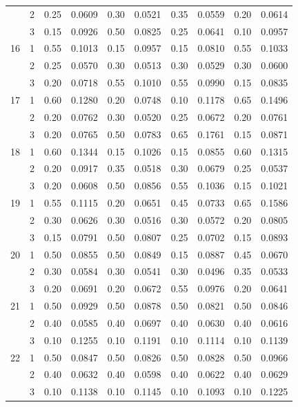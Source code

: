 \begin{longtable}{llcccccccc}
   & 2 & 0.25 & 0.0609 & 0.30 & 0.0521 & 0.35 & 0.0559 & 0.20 & 0.0614 \\ 
   & 3 & 0.15 & 0.0926 & 0.50 & 0.0825 & 0.25 & 0.0641 & 0.10 & 0.0957 \\ 
  16 & 1 & 0.55 & 0.1013 & 0.15 & 0.0957 & 0.15 & 0.0810 & 0.55 & 0.1033 \\ 
   & 2 & 0.25 & 0.0570 & 0.30 & 0.0513 & 0.30 & 0.0529 & 0.30 & 0.0600 \\ 
   & 3 & 0.20 & 0.0718 & 0.55 & 0.1010 & 0.55 & 0.0990 & 0.15 & 0.0835 \\ 
  17 & 1 & 0.60 & 0.1280 & 0.20 & 0.0748 & 0.10 & 0.1178 & 0.65 & 0.1496 \\ 
   & 2 & 0.20 & 0.0762 & 0.30 & 0.0520 & 0.25 & 0.0672 & 0.20 & 0.0761 \\ 
   & 3 & 0.20 & 0.0765 & 0.50 & 0.0783 & 0.65 & 0.1761 & 0.15 & 0.0871 \\ 
  18 & 1 & 0.60 & 0.1344 & 0.15 & 0.1026 & 0.15 & 0.0855 & 0.60 & 0.1315 \\ 
   & 2 & 0.20 & 0.0917 & 0.35 & 0.0518 & 0.30 & 0.0679 & 0.25 & 0.0537 \\ 
   & 3 & 0.20 & 0.0608 & 0.50 & 0.0856 & 0.55 & 0.1036 & 0.15 & 0.1021 \\ 
  19 & 1 & 0.55 & 0.1115 & 0.20 & 0.0651 & 0.45 & 0.0733 & 0.65 & 0.1586 \\ 
   & 2 & 0.30 & 0.0626 & 0.30 & 0.0516 & 0.30 & 0.0572 & 0.20 & 0.0805 \\ 
   & 3 & 0.15 & 0.0791 & 0.50 & 0.0807 & 0.25 & 0.0702 & 0.15 & 0.0893 \\ 
  20 & 1 & 0.50 & 0.0855 & 0.50 & 0.0849 & 0.15 & 0.0887 & 0.45 & 0.0670 \\ 
   & 2 & 0.30 & 0.0584 & 0.30 & 0.0541 & 0.30 & 0.0496 & 0.35 & 0.0533 \\ 
   & 3 & 0.20 & 0.0691 & 0.20 & 0.0672 & 0.55 & 0.0976 & 0.20 & 0.0641 \\ 
  21 & 1 & 0.50 & 0.0929 & 0.50 & 0.0878 & 0.50 & 0.0821 & 0.50 & 0.0846 \\ 
   & 2 & 0.40 & 0.0585 & 0.40 & 0.0697 & 0.40 & 0.0630 & 0.40 & 0.0616 \\ 
   & 3 & 0.10 & 0.1255 & 0.10 & 0.1191 & 0.10 & 0.1114 & 0.10 & 0.1139 \\ 
  22 & 1 & 0.50 & 0.0847 & 0.50 & 0.0826 & 0.50 & 0.0828 & 0.50 & 0.0966 \\ 
   & 2 & 0.40 & 0.0632 & 0.40 & 0.0598 & 0.40 & 0.0622 & 0.40 & 0.0629 \\ 
   & 3 & 0.10 & 0.1138 & 0.10 & 0.1145 & 0.10 & 0.1093 & 0.10 & 0.1225 \\ 

\end{longtable}
